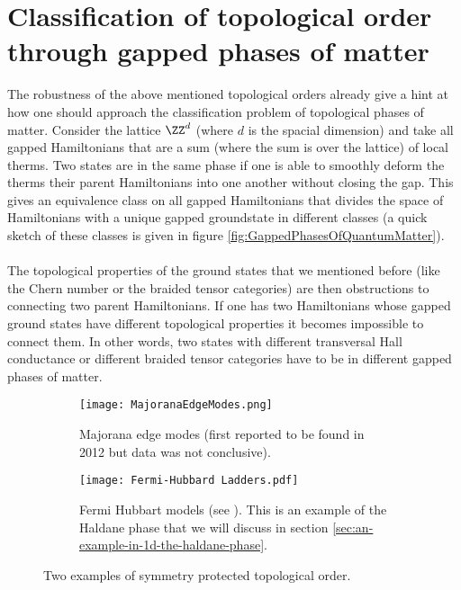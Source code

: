 \section{Classification of topological order through gapped phases of matter}
The robustness of the above mentioned topological orders already give a hint at how one should approach the classification problem of topological phases of matter. Consider the lattice $\ZZ^d$ (where $d$ is the spacial dimension) and take all gapped Hamiltonians that are a sum (where the sum is over the lattice) of local therms. Two states are in the same phase if one is able to smoothly deform the therms their parent Hamiltonians into one another without closing the gap. This gives an equivalence class on all gapped Hamiltonians that divides the space of Hamiltonians with a unique gapped groundstate in different classes (a quick sketch of these classes is given in figure \ref{fig:GappedPhasesOfQuantumMatter}).
\\\\
The topological properties of the ground states that we mentioned before (like the Chern number or the braided tensor categories) are then obstructions to connecting two parent Hamiltonians. If one has two Hamiltonians whose gapped ground states have different topological properties it becomes impossible to connect them. In other words, two states with different transversal Hall conductance or different braided tensor categories have to be in different gapped phases of matter.
\begin{figure}
	\begin{subfigure}[b]{0.45\textwidth}
		\centering
		\texttt{[image: MajoranaEdgeModes.png]}
		\caption{Majorana edge modes (first reported to be found in 2012 but data was not conclusive).}
	\end{subfigure}
	\hfil
	\begin{subfigure}[b]{0.45\textwidth}
		\centering
		\texttt{[image: Fermi-Hubbard Ladders.pdf]}
		\caption{Fermi Hubbart models (see \cite{sompet2022realizing}). This is an example of the Haldane phase that we will discuss in section \ref{sec:an-example-in-1d-the-haldane-phase}.}
	\end{subfigure}
	\caption{Two examples of symmetry protected topological order.}
	\label{fig:SymmetryProtectedTopologicalOrderFigures}
\end{figure}
